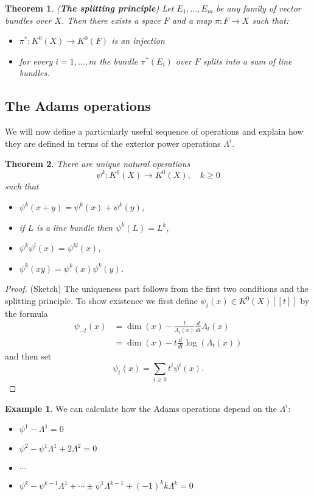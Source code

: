 \documentclass[a4paper,10pt]{article}
\theoremstyle{plain}%
\newtheorem{thm}{Theorem}
\theoremstyle{definition}
\newtheorem{exmp}{Example}
\theoremstyle{remark}
\begin{document}
\begin{thm}({\bf The splitting principle})
Let $E_1,\ldots,E_m$ be any family of vector bundles over $X$. Then there exists a space $F$ and a map $\pi: F\to X$ such that:
\begin{itemize}
\item $\pi^*: K^0(X)\to K^0(F)$ is an injection
\item for every $i=1,\ldots,m$ the bundle $\pi^*(E_i)$ over $F$ splits into a sum of line bundles.
\end{itemize}
\end{thm}



\subsection{The Adams operations}

We will now define a particularly useful sequence of operations and explain how they are defined in terms of the exterior power operations $\Lambda^i$.

\begin{thm}
There are unique natural operations
$$\psi^k: K^0(X)\to K^0(X), \quad k\geq 0$$
such that
\begin{itemize}
\item $\psi^k(x+y)=\psi^k(x)+\psi^k(y)$,
\item if $L$ is a line bundle then $\psi^k(L)=L^k$,
\item $\psi^k\psi^l(x)=\psi^{kl}(x)$,
\item $\psi^k(xy)=\psi^k(x)\psi^k(y)$.
\end{itemize}
\end{thm}
\begin{proof}(Sketch)
The uniqueness part follows from the first two conditions and the splitting principle. To show existence we first define $\psi_t(x)\in K^0(X)[[t]]$ by the formula
\begin{align*}
\psi_{-t}(x)&= \dim(x)-\frac{t}{\Lambda_t(x)}\frac{d}{dt}\Lambda_{t}(x)\\
&= \dim(x)-t\frac{d}{dt}\log(\Lambda_{t}(x))
\end{align*}
and then set 
$$\psi_t(x)=\sum_{i\geq 0}t^i\psi^i(x).$$
\end{proof}

\begin{exmp}
We can calculate how the Adams operations depend on the $\Lambda^i$:
\begin{itemize}
\item $\psi^1-\Lambda^1=0$
\item $\psi^2-\psi^1\Lambda^1+2\Lambda^2=0$
\item $\cdots$
\item $\psi^k-\psi^{k-1}\Lambda^1+\cdots\pm\psi^1\Lambda^{k-1}+(-1)^kk\Lambda^k=0$

\end{itemize}
\end{exmp}
\end{document}
